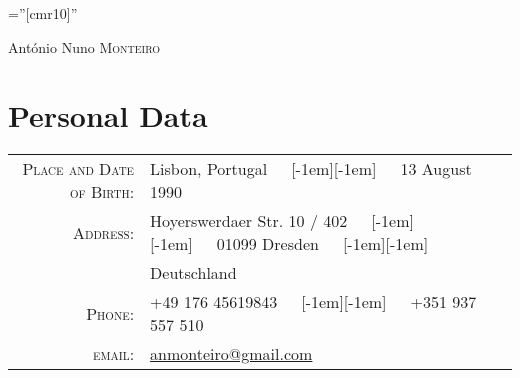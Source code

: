 \documentclass[a4paper,10pt]{article}
\newcommand*\bull{\raisebox{-0.365em}[-1em][-1em]{\textscale{4}{$\cdot$}}}
\newcommand*\sbull{\ \ \bull \ \ }
\begin{document}

\pagestyle{empty} %

\font\fb=''[cmr10]'' %

\par{\centering
		{\Huge António Nuno \textsc{Monteiro}
	}\bigskip\par}

\section{Personal Data}

\begin{tabular}{rl}
    \textsc{Place and Date of Birth:} & Lisbon, Portugal~\sbull~13 August 1990 \\
    \textsc{Address:}   & Hoyerswerdaer Str. 10 / 402~\sbull~01099 Dresden~\sbull~\\
    & Deutschland \\
    \textsc{Phone:}     & +49 176 45619843~\sbull~+351 937 557 510\\
    \textsc{email:}     & \href{mailto:anmonteiro@gmail.com}{anmonteiro@gmail.com}
\end{tabular}

\end{document}
